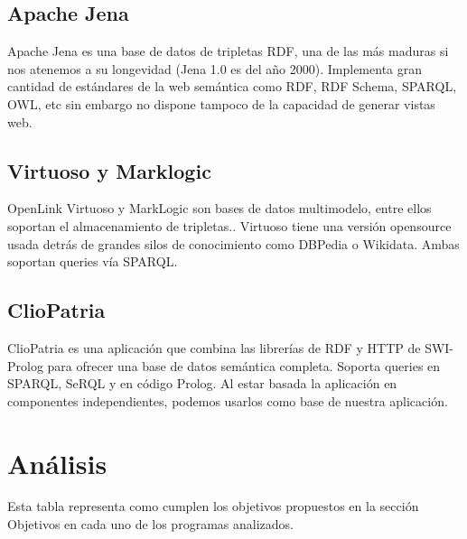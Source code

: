 \documentclass[12pt]{report} %
\begin{document}
\subsection{Apache Jena}
Apache Jena es una base de datos de tripletas RDF, una de las más maduras si nos atenemos a su longevidad (Jena 1.0 es del año 2000).\cite{couchdb}
Implementa gran cantidad de estándares de la web semántica como RDF, RDF Schema, SPARQL, OWL, etc sin embargo no dispone tampoco de la capacidad de generar vistas web.

\subsection{Virtuoso y Marklogic}
OpenLink Virtuoso y MarkLogic son bases de datos multimodelo, entre ellos soportan el almacenamiento de tripletas.\cite{virtuoso}\cite{marklogic}.
Virtuoso tiene una versión opensource usada detrás de grandes silos de conocimiento como DBPedia o Wikidata. Ambas soportan queries vía SPARQL.

\subsection{ClioPatria}
ClioPatria es una aplicación que combina las librerías de RDF y HTTP de SWI-Prolog para ofrecer una base de datos semántica completa.\cite{cliopatria}
Soporta queries en SPARQL, SeRQL y en código Prolog. Al estar basada la aplicación en componentes independientes, podemos usarlos como base
de nuestra aplicación.

\section{Análisis}

Esta tabla representa como cumplen los objetivos propuestos en la sección Objetivos en cada uno de los programas analizados.
\end{document}
